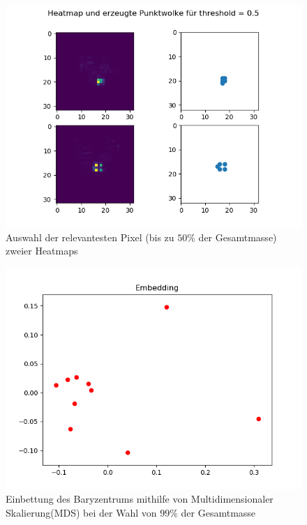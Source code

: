 \documentclass[twoside, 12pt,a4paper]{article}
\numberwithin{equation}{section}
\begin{document}
	\begin{figure}[h]
		\begin{center}
			\includegraphics[width=0.5\textheight]{HeatmapPunktwolke50.png}
			\caption{Auswahl der relevantesten Pixel (bis zu $50\%$ der Gesamtmasse) zweier Heatmaps}
		\end{center}
	\end{figure}
	
	\begin{figure}[h]
		\begin{center}
			\includegraphics[width=0.5\textheight]{bary_embedding99.png}
			\caption{Einbettung des Baryzentrums mithilfe von Multidimensionaler Skalierung(MDS) bei der Wahl von $99\%$ der Gesamtmasse}
		\end{center}
	\end{figure}
	
\end{document}
